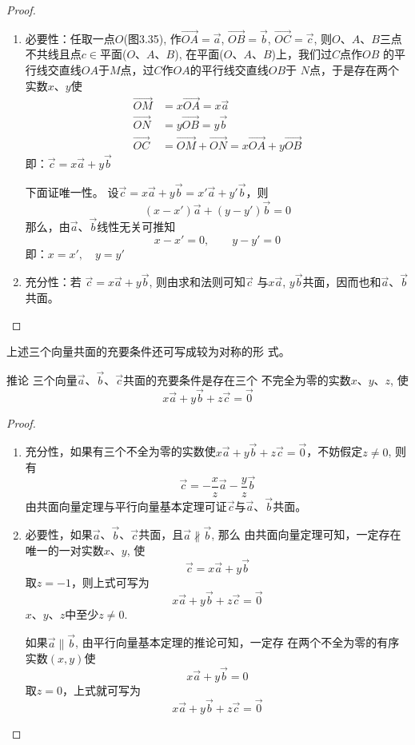 \begin{proof}
\begin{enumerate}
    \item 必要性：任取一点$O$(图3.35), 作$\Vec{OA}=\vec{a}$, 
    $\Vec{OB}=\vec{b}$, $\Vec{OC}=\vec{c}$, 则$O$、$A$、$B$三点不共线且点$c\in $平面($O$、$A$、$B$), 在平面($O$、$A$、$B$)上，我们过$C$点作$OB$
    的平行线交直线$OA$于$M$点，过$C$作$OA$的平行线交直线$OB$于
    $N$点，于是存在两个实数$x$、$y$使
\[\begin{split}
     \Vec{OM}&=x\Vec{OA}=x\vec{a}\\
     \Vec{ON}&=y\Vec{OB}=y\vec{b}\\
     \Vec{OC}&=\Vec{OM}+\Vec{ON}=x\Vec{OA}+y\Vec{OB}
\end{split}\]
即：$\vec{c}=x\vec{a}+y\vec{b}$

下面证唯一性。
设$\vec{c}=x\vec{a}+y\vec{b}=x'\vec{a}+y'\vec{b}$，则\
\[(x-x')\vec{a}+(y-y')\vec{b}=0\]
那么，由$\vec{a}$、$\vec{b}$线性无关可推知
\[x-x'=0,\qquad y-y'=0\]
即：$x=x',\quad y=y'$

\item 充分性：若
$\vec{c}=x\vec{a}+y\vec{b}$, 则由求和法则可知$\vec{c}$
与$x\vec{a}$, $y\vec{b}$共面，因而也和$\vec{a}$、$\vec{b}$共面。
\end{enumerate}
\end{proof}

上述三个向量共面的充要条件还可写成较为对称的形
式。

\begin{blk}
    {推论} 三个向量$\vec{a}$、$\vec{b}$、$\vec{c}$共面的充要条件是存在三个
不完全为零的实数$x$、$y$、$z$, 使
\[x\vec{a}+y\vec{b}+z\vec{c}=\vec{0}\]
\end{blk}

\begin{proof}
\begin{enumerate}
    \item 充分性，如果有三个不全为零的实数使$x\vec{a}+y\vec{b}+z\vec{c}=\vec{0}$，不妨假定$z\ne 0$, 则有
\[\vec{c}=-\frac{x}{z}\vec{a}-\frac{y}{z}\vec{b}\]
    由共面向量定理与平行向量基本定理可证$\vec{c}$与$\vec{a}$、$\vec{b}$共面。

\item 必要性，如果$\vec{a}$、$\vec{b}$、$\vec{c}$共面，且$\vec{a}\nparallel \vec{b}$, 那么
由共面向量定理可知，一定存在唯一的一对实数$x$、$y$, 使
\[\vec{c}=x\vec{a}+y\vec{b}\]
取$z=-1$，则上式可写为
\[x\vec{a}+y\vec{b}+z\vec{c}=\vec{0}\]
$x$、$y$、$z$中至少$z\ne 0$.

如果$\vec{a}\parallel \vec{b}$, 由平行向量基本定理的推论可知，一定存
在两个不全为零的有序实数$(x,y)$使
\[x\vec{a}+y\vec{b}=0\]
取$z=0$，上式就可写为
\[x\vec{a}+y\vec{b}+z\vec{c}=\vec{0}\]
\end{enumerate}
\end{proof}    


